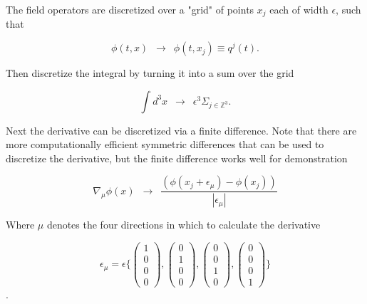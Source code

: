 \noindent The field operators are discretized over a "grid" of points $x_j$ each of width $\epsilon$, such that

\begin{equation}
\phi(t, x) \,\,\, \rightarrow \,\,\, \phi(t, x_j) \equiv q^j (t).
\end{equation}

\noindent Then discretize the integral by turning it into a sum over the grid

\begin{equation}
\int d^3 x  \,\,\, \rightarrow \,\,\, \epsilon^3 \Sigma_{j \in \mathbb{Z}^3} .
\end{equation}

\noindent Next the derivative can be discretized via a finite difference. Note that there are more computationally efficient symmetric differences that can be used to discretize the derivative, but the finite difference works well for demonstration

\begin{equation}
\nabla_\mu \phi(x) \,\,\, \rightarrow  \,\,\, \frac{(\phi(x_j + \epsilon_\mu) - \phi(x_j))}{|\epsilon_\mu|}
\end{equation}

\noindent Where $\mu$ denotes the four directions in which to calculate the derivative

\begin{equation}
\epsilon_{\mu} = \epsilon \{ \left(\begin{smallmatrix}1\\0\\0\\0\end{smallmatrix}\right), \left(\begin{smallmatrix}0\\1\\0\\0\end{smallmatrix}\right), \left(\begin{smallmatrix}0\\0\\1\\0\end{smallmatrix}\right), \left(\begin{smallmatrix}0\\0\\0\\1\end{smallmatrix}\right) \}
\end{equation}.

